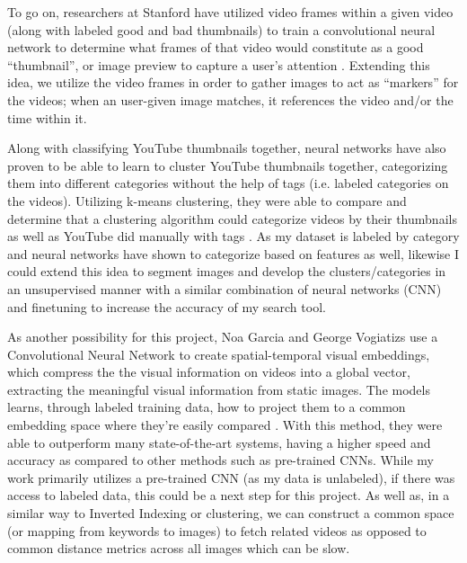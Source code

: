 \documentclass[10pt,twocolumn]{article}
\begin{document}
To go on, researchers at Stanford have utilized video frames within a given video (along with labeled good and bad thumbnails) to train a convolutional neural network to determine what frames of that video would constitute as a good “thumbnail”, or image preview to capture a user’s attention \cite{Stanford2017}. Extending this idea, we utilize the video frames in order to gather images to act as “markers” for the videos; when an user-given image matches, it references the video and/or the time within it.

Along with classifying YouTube thumbnails together, neural networks have also proven to be able to learn to cluster YouTube thumbnails together, categorizing them into different categories without the help of tags (i.e. labeled categories on the videos). Utilizing k-means clustering, they were able to compare and determine that a clustering algorithm could categorize videos by their thumbnails as well as YouTube did manually with tags \cite{Stanford2021}. As my dataset is labeled by category and neural networks have shown to categorize based on features as well, likewise I could extend this idea to segment images and develop the clusters/categories in an unsupervised manner with a similar combination of neural networks (CNN) and finetuning to increase the accuracy of my search tool.

As another possibility for this project, Noa Garcia and George Vogiatizs use a Convolutional Neural Network to create spatial-temporal visual embeddings, which compress the the visual information on videos into a global vector, extracting the meaningful visual information from static images. The models learns, through labeled training data, how to project them to a common embedding space where they're easily compared \cite{Garcia2018TODODOD}. With this method, they were able to outperform many state-of-the-art systems, having a higher speed and accuracy as compared to other methods such as pre-trained CNNs. While my work primarily utilizes a pre-trained CNN (as my data is unlabeled), if there was access to labeled data, this could be a next step for this project. As well as, in a similar way to Inverted Indexing or clustering, we can construct a common space (or mapping from keywords to images) to fetch related videos as opposed to common distance metrics across all images which can be slow.



\end{document}
